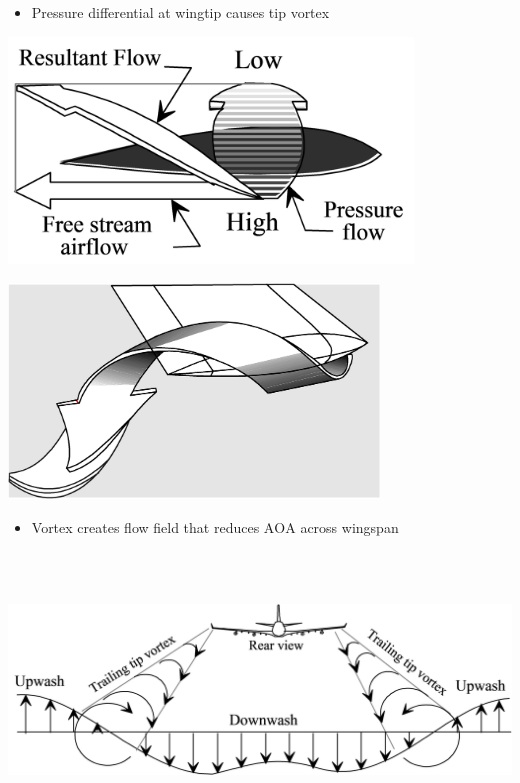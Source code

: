 \documentclass[
]{book}
\providecommand{\tightlist}{%
  \setlength{\itemsep}{0pt}\setlength{\parskip}{0pt}}
\begin{document}
\begin{itemize}
\tightlist
\item
  Pressure differential at wingtip causes tip vortex
\end{itemize}

\includegraphics[width=4.231in,height=2.375in]{media/05/image13.svg}

\includegraphics[width=3.875in,height=2.249in]{media/05/image14.svg}

\begin{itemize}
\tightlist
\item
  Vortex creates flow field that reduces \(\mathrm{AOA}\) across wingspan
\end{itemize}

\includegraphics[width=8.8in,height=2.882in]{media/05/image15.svg}
\end{document}
